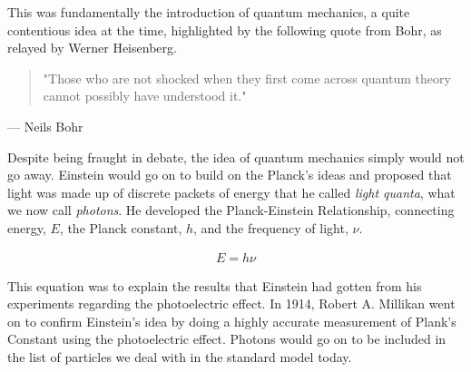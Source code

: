 This was fundamentally the introduction of quantum mechanics, a quite contentious idea at the time, highlighted by the following quote from Bohr, as relayed by Werner Heisenberg\cite{Heisenberg_1971}.

\begin{quote}
"Those who are not shocked when they first come across quantum theory cannot possibly have understood it."
\end{quote}

\begin{flushright}--- Neils Bohr\end{flushright}

Despite being fraught in debate, the idea of quantum mechanics simply would not go away.
Einstein would go on to build on the Planck's ideas and proposed that light was made up of discrete packets of energy that he called \textit{light quanta}\cite{Einstein_1905}, what we now call \textit{photons}\cite{LEWIS_1926}.
He developed the Planck-Einstein Relationship, connecting energy, $E$, the Planck constant, $h$, and the frequency of light, $\nu$.

\begin{align}
  E = h \nu
\end{align}


This equation was to explain the results that Einstein had gotten from his experiments regarding the photoelectric effect\cite{Einstein_1905}.
In 1914, Robert A. Millikan went on to confirm Einstein's idea by doing a highly accurate measurement of Plank's Constant using the photoelectric effect\cite{Millikan_1914}.
Photons would go on to be included in the list of particles we deal with in the standard model today.


